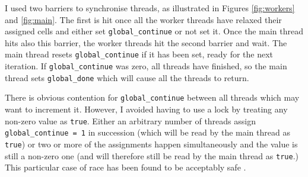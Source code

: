 \documentclass[12pt]{article}
\begin{document}
I used two barriers to synchronise threads, as illustrated in Figures \ref{fig:workers} and \ref{fig:main}. The first is hit once all the worker threads have relaxed their assigned cells and either set \texttt{global\_continue} or not set it. Once the main thread hits also this barrier, the worker threads hit the second barrier and wait. The main thread resets \texttt{global\_continue} if it has been set, ready for the next iteration. If \texttt{global\_continue} was zero, all threads have finished, so the main thread sets \texttt{global\_done} which will cause all the threads to return.

There is obvious contention for \texttt{global\_continue} between all threads which may want to increment it. However, I avoided having to use a lock by treating any non-zero value as \texttt{true}. Either an arbitrary number of threads assign \texttt{global\_continue = 1} in succession (which will be read by the main thread as \texttt{true}) or two or more of the assignments happen simultaneously and the value is still a non-zero one (and will therefore still be read by the main thread as \texttt{true}.) This particular case of race has been found to be acceptably safe \citep{benigndataraces}.
\end{document}
